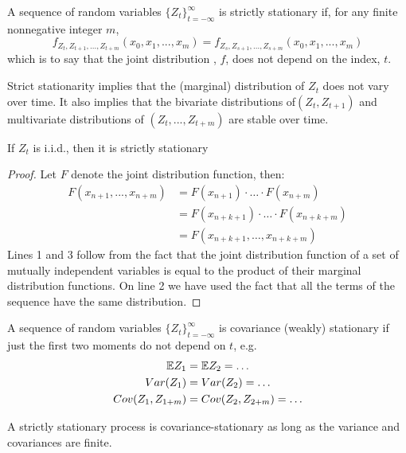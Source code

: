 \documentclass[DIV=14,titlepage=false]{scrreprt}
\begin{document}
\begin{definition}
    A sequence of random variables $\{Z_t\}^{\infty}_{t=-\infty}$ is strictly stationary if, for any finite nonnegative integer $m$,
    \[
        f_{Z_t, Z_{t+1}, ..., Z_{t+m}}(x_0, x_1, ..., x_m)=  f_{Z_s, Z_{s+1}, ..., Z_{s+m}}(x_0, x_1, ..., x_m)
    \]
    which is to say that the joint distribution , $f$, does not depend on the index, $t$.
\end{definition}
Strict stationarity implies that the (marginal) distribution of $Z_t$ does not vary over time. It also implies that the bivariate distributions of$ (Z_t, Z_{t+1})$ and multivariate distributions of $ (Z_t, ..., Z_{t+m})$ are stable over time.

\begin{theorem}
    If $Z_t$ is i.i.d., then it is strictly stationary
\end{theorem}
\begin{proof}
    Let $F$ denote the joint distribution function, then:
    \begin{align*}
        F(x_{n+1}, ..., x_{n+m}) &= F(x_{n+1})\cdot \dots \cdot F(x_{n+m})\\
        &= F(x_{n+k+1})\cdot \dots \cdot F(x_{n+k+m})\\
        &= F(x_{n+k+1},\dots,x_{n+k+m})
    \end{align*}
    Lines 1 and 3 follow from the fact that the joint distribution function of a set of mutually independent variables is equal to the product of their marginal distribution functions. On line 2 we have used the fact that all the terms of the sequence have the same distribution. 
\end{proof}


\begin{definition}
    A sequence of random variables $\{Z_t\}^{\infty}_{t=-\infty}$ is covariance (weakly) stationary if just the first two moments do not depend on $t$, e.g.
    \begin{align*}
        \mathbb{E} Z_1 &= \mathbb{E} Z_2 = \dots\\
        Var(Z_1)&=Var(Z_2)= \dots\\
        Cov(Z_1, Z_{1+m}) &= Cov(Z_2, Z_{2+m}) = \dots
    \end{align*}
\end{definition}
A strictly stationary process is covariance-stationary as long as the variance and covariances are finite.
\end{document}

